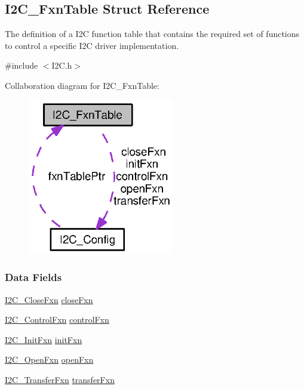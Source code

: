 \subsection{I2\-C\-\_\-\-Fxn\-Table Struct Reference}
\label{struct_i2_c___fxn_table}


The definition of a I2\-C function table that contains the required set of functions to control a specific I2\-C driver implementation.  




{\ttfamily \#include $<$I2\-C.\-h$>$}



Collaboration diagram for I2\-C\-\_\-\-Fxn\-Table\-:
\nopagebreak
\begin{figure}[H]
\begin{center}
\leavevmode
\includegraphics[width=181pt]{struct_i2_c___fxn_table__coll__graph}
\end{center}
\end{figure}
\subsubsection*{Data Fields}
\begin{DoxyCompactItemize}
\item 
\hyperlink{_i2_c_8h_a4a97bfbbab241bfc50dbad36ce112e74}{I2\-C\-\_\-\-Close\-Fxn} \hyperlink{struct_i2_c___fxn_table_a02f4e6a7daeb64d6741372a5636eedb5}{close\-Fxn}
\item 
\hyperlink{_i2_c_8h_ac269dcf2d893ffe5a5c085c11e4e5f84}{I2\-C\-\_\-\-Control\-Fxn} \hyperlink{struct_i2_c___fxn_table_af23db6bdc9b619633fb70ddff44412ea}{control\-Fxn}
\item 
\hyperlink{_i2_c_8h_adeda16d09cad1634a29721e4e9bcab00}{I2\-C\-\_\-\-Init\-Fxn} \hyperlink{struct_i2_c___fxn_table_ae27540a7175c9ad14b590ddc92e06390}{init\-Fxn}
\item 
\hyperlink{_i2_c_8h_a553130379966a990856fd50c30699df7}{I2\-C\-\_\-\-Open\-Fxn} \hyperlink{struct_i2_c___fxn_table_afb8c5f67ba6d0941f6265707083b16f8}{open\-Fxn}
\item 
\hyperlink{_i2_c_8h_a25199ad36e7bcf7def0d7e0ab2063a4b}{I2\-C\-\_\-\-Transfer\-Fxn} \hyperlink{struct_i2_c___fxn_table_a16048b22814e3d123f82a7674599b15c}{transfer\-Fxn}
\end{DoxyCompactItemize}



